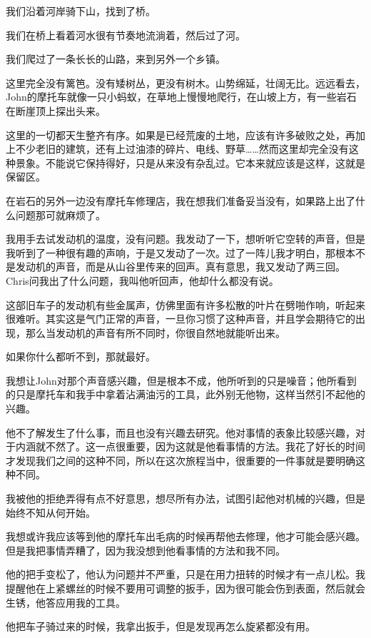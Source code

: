 \documentclass[UTF8]{article}
\begin{document}
\par 我们沿着河岸骑下山，找到了桥。
\par 我们在桥上看着河水很有节奏地流淌着，然后过了河。
\par 我们爬过了一条长长的山路，来到另外一个乡镇。
\par 这里完全没有篱笆。没有矮树丛，更没有树木。山势绵延，壮阔无比。远远看去，John的摩托车就像一只小蚂蚁，在草地上慢慢地爬行，在山坡上方，有一些岩石在断崖顶上探出头来。
\par 这里的一切都天生整齐有序。如果是已经荒废的土地，应该有许多破败之处，再加上不少老旧的建筑，还有上过油漆的碎片、电线、野草……然而这里却完全没有这种景象。不能说它保持得好，只是从来没有杂乱过。它本来就应该是这样，这就是保留区。
\par 在岩石的另外一边没有摩托车修理店，我在想我们准备妥当没有，如果路上出了什么问题那可就麻烦了。
\par 我用手去试发动机的温度，没有问题。我发动了一下，想听听它空转的声音，但是我听到了一种很有趣的声响，于是又发动了一次。过了一阵儿我才明白，那根本不是发动机的声音，而是从山谷里传来的回声。真有意思，我又发动了两三回。Chris问我出了什么问题，我叫他听回声，他却什么都没有说。
\par 这部旧车子的发动机有些金属声，仿佛里面有许多松散的叶片在劈啪作响，听起来很难听。其实这是气门正常的声音，一旦你习惯了这种声音，并且学会期待它的出现，那么当发动机的声音有所不同时，你很自然地就能听出来。
\par 如果你什么都听不到，那就最好。
\par 我想让John对那个声音感兴趣，但是根本不成，他所听到的只是噪音；他所看到的只是摩托车和我手中拿着沾满油污的工具，此外别无他物，这样当然引不起他的兴趣。
\par 他不了解发生了什么事，而且也没有兴趣去研究。他对事情的表象比较感兴趣，对于内涵就不然了。这一点很重要，因为这就是他看事情的方法。我花了好长的时间才发现我们之间的这种不同，所以在这次旅程当中，很重要的一件事就是要明确这种不同。
\par 我被他的拒绝弄得有点不好意思，想尽所有办法，试图引起他对机械的兴趣，但是始终不知从何开始。
\par 我想或许我应该等到他的摩托车出毛病的时候再帮他去修理，他才可能会感兴趣。但是我把事情弄糟了，因为我没想到他看事情的方法和我不同。
\par 他的把手变松了，他认为问题并不严重，只是在用力扭转的时候才有一点儿松。我提醒他在上紧螺丝的时候不要用可调整的扳手，因为很可能会伤到表面，然后就会生锈，他答应用我的工具。
\par 他把车子骑过来的时候，我拿出扳手，但是发现再怎么旋紧都没有用。
\end{document}
